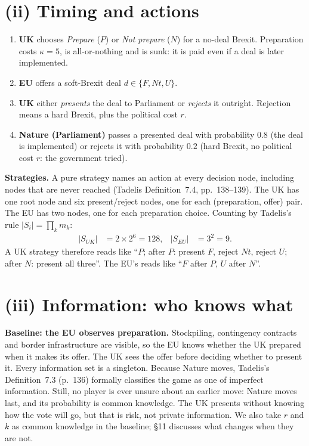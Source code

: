 \documentclass[11pt,a4paper]{article}
\newcommand{\Nt}{\mathit{Nt}}
\newcommand{\dF}{\mathit{F}}
\newcommand{\dU}{\mathit{U}}
\begin{document}
\section{(ii) Timing and actions}

\begin{enumerate}[label=\textbf{Stage \arabic*.},leftmargin=4.6em]
  \item \textbf{UK} chooses \emph{Prepare} ($P$) or \emph{Not prepare} ($N$) for a no-deal
    Brexit. Preparation costs $\kappa=5$, is all-or-nothing and is sunk: it is paid even if a deal
    is later implemented.
  \item \textbf{EU} offers a soft-Brexit deal $d\in\{\dF,\Nt,\dU\}$.
  \item \textbf{UK} either \emph{presents} the deal to Parliament or \emph{rejects} it outright.
    Rejection means a hard Brexit, plus the political cost $r$.
  \item \textbf{Nature (Parliament)} passes a presented deal with probability $0.8$ (the deal is
    implemented) or rejects it with probability $0.2$ (hard Brexit, no political cost $r$:
    the government tried).
\end{enumerate}

\textbf{Strategies.} A pure strategy names an action at every decision node, including nodes that
are never reached (Tadelis Definition~7.4, pp.~138--139). The UK has one root node and six
present/reject nodes, one for each (preparation, offer) pair. The EU has two nodes, one for each
preparation choice. Counting by Tadelis's rule $\lvert S_i\rvert=\prod_k m_k$:
\begin{align*}
  \lvert S_{UK}\rvert &= 2\times2^6 = 128, & \lvert S_{EU}\rvert &= 3^2 = 9 .
\end{align*}
A UK strategy therefore reads like ``$P$; after $P$: present $\dF$, reject $\Nt$, reject $\dU$;
after $N$: present all three''. The EU's reads like ``$\dF$ after $P$, $\dU$ after $N$''.

\section{(iii) Information: who knows what}

\textbf{Baseline: the EU observes preparation.} Stockpiling, contingency contracts and border
infrastructure are visible, so the EU knows whether the UK prepared when it makes its offer.
The UK sees the offer before deciding whether to present it. Every information set is a
singleton. Because Nature moves, Tadelis's Definition~7.3 (p.~136) formally classifies the game as
one of imperfect information. Still, no player is ever unsure about an earlier move: Nature moves
last, and its probability is common knowledge. The UK presents without knowing how the vote will
go, but that is risk, not private information. We also take $r$ and $k$ as common knowledge in the
baseline; \S11 discusses what changes when they are not.
\end{document}
